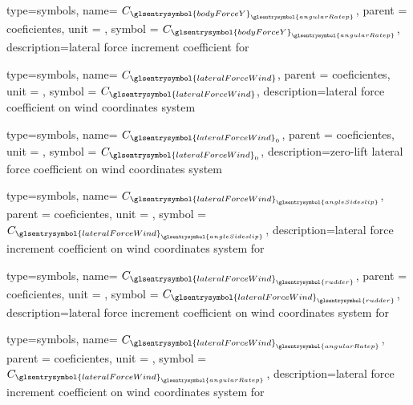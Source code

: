 {type=symbols,
    name= \ensuremath{C_{{\glsentrysymbol{bodyForceY}}_{\glsentrysymbol{angularRatep}}}},
    parent = {coeficientes},
    unit = \unexpanded{},
    symbol = \ensuremath{C_{{\glsentrysymbol{bodyForceY}}_{\glsentrysymbol{angularRatep}}}},
    description={lateral force increment coefficient for }
}



{type=symbols,
    name= \ensuremath{C_{\glsentrysymbol{lateralForceWind}}},
    parent = {coeficientes},
    unit = \unexpanded{},
    symbol = \ensuremath{C_{\glsentrysymbol{lateralForceWind}}},
    description={lateral force coefficient on wind coordinates system }
}

{type=symbols,
    name= \ensuremath{C_{\glsentrysymbol{lateralForceWind}_{0}}},
    parent = {coeficientes},
    unit = \unexpanded{},
    symbol = \ensuremath{C_{\glsentrysymbol{lateralForceWind}_{0}}},
    description={zero-lift lateral force coefficient on wind coordinates system }
}

{type=symbols,
    name= \ensuremath{C_{{\glsentrysymbol{lateralForceWind}}_{\glsentrysymbol{angleSideslip}}}},
    parent = {coeficientes},
    unit = \unexpanded{},
    symbol = \ensuremath{C_{{\glsentrysymbol{lateralForceWind}}_{\glsentrysymbol{angleSideslip}}}},
    description={lateral force increment coefficient on wind coordinates system  for }
}

{type=symbols,
    name= \ensuremath{C_{{\glsentrysymbol{lateralForceWind}}_{\glsentrysymbol{rudder}}}},
    parent = {coeficientes},
    unit = \unexpanded{},
    symbol = \ensuremath{C_{{\glsentrysymbol{lateralForceWind}}_{\glsentrysymbol{rudder}}}},
    description={lateral force increment coefficient on wind coordinates system  for }
}


{type=symbols,
    name= \ensuremath{C_{{\glsentrysymbol{lateralForceWind}}_{\glsentrysymbol{angularRatep}}}},
    parent = {coeficientes},
    unit = \unexpanded{},
    symbol = \ensuremath{C_{{\glsentrysymbol{lateralForceWind}}_{\glsentrysymbol{angularRatep}}}},
    description={lateral force increment coefficient on wind coordinates system  for }
}

